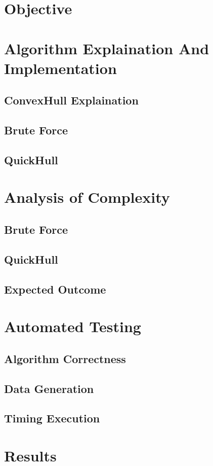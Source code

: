 \documentclass{article}
\begin{document}

{
  \section{Objective}

  \section{Algorithm Explaination And Implementation}
  \subsection{ConvexHull Explaination}
  \subsection{Brute Force}
  \subsection{QuickHull}
  \section{Analysis of Complexity}
  \subsection{Brute Force}
  \subsection{QuickHull}
  \subsection{Expected Outcome}
  \section{Automated Testing}
  \subsection{Algorithm Correctness}
  \subsection{Data Generation}
  \subsection{Timing Execution}
  \section{Results}
}
\end{document}
